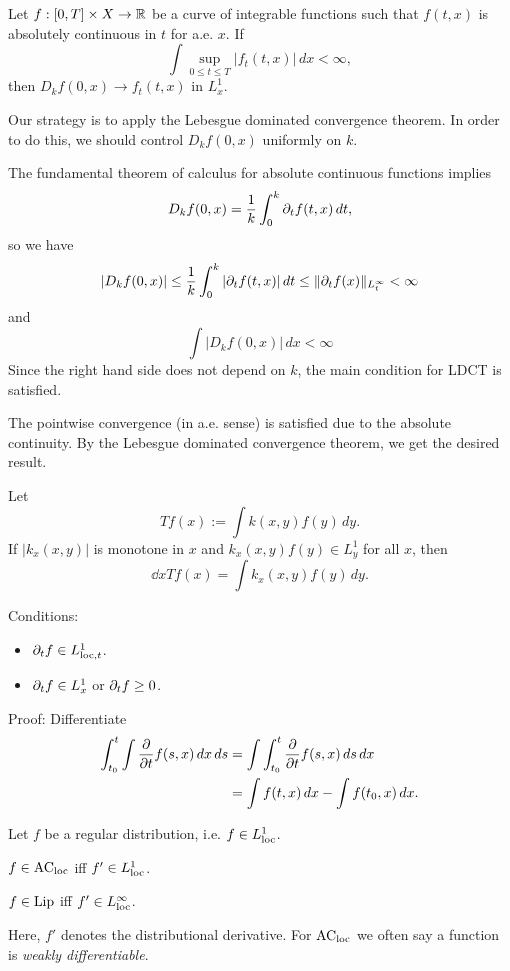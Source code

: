 \documentclass[12pt]{article}
\def\AC{\mathrm{AC}}
\begin{document}
\begin{thm}
Let $f:[0,T]\times X\to\mathbb{R}$ be a curve of integrable functions such that $f(t,x)$ is absolutely continuous in $t$ for a.e. $x$.
If
\[\int\sup_{0\le t\le T}|f_t(t,x)|\,dx<\infty,\]
then $D_kf(0,x)\to f_t(t,x)$ in $L_x^1$.
\end{thm}
\begin{pf}
Our strategy is to apply the Lebesgue dominated convergence theorem.
In order to do this, we should control $D_kf(0,x)$ uniformly on $k$.

The fundamental theorem of calculus for absolute continuous functions implies
\[D_kf(0,x)=\frac1k\int_0^k\pd_tf(t,x)\,dt,\]
so we have
\[|D_kf(0,x)|\le\frac1k\int_0^k|\pd_tf(t,x)|\,dt\le\|\pd_tf(x)\|_{L_t^\infty}<\infty\]
and
\[\int|D_kf(0,x)|\,dx<\infty\]
Since the right hand side does not depend on $k$, the main condition for LDCT is satisfied.

The pointwise convergence (in a.e. sense) is satisfied due to the absolute continuity.
By the Lebesgue dominated convergence theorem, we get the desired result.
\end{pf}
\begin{cor}
Let
\[Tf(x):=\int k(x,y)f(y)\,dy.\]
If $|k_x(x,y)|$ is monotone in $x$ and $k_x(x,y)f(y)\in L_y^1$ for all $x$, then
\[\dd{x}Tf(x)=\int k_x(x,y)f(y)\,dy.\]
\end{cor}


Conditions:
\begin{itemize}
\item $\pd_tf\in L_{\loc,t}^1$.
\item $\pd_tf\in L_x^1$ or $\pd_tf\ge0$.
\end{itemize}
Proof: Differentiate
\begin{align*}
\int^t_{t_0}\int\pd{t}f(s,x)\,dx\,ds
&=\int\int^t_{t_0}\pd{t}f(s,x)\,ds\,dx\\
&=\int f(t,x)\,dx-\int f(t_0,x)\,dx.
\end{align*}

Let $f$ be a regular distribution, i.e. $f\in L_{\mathrm{loc}}^1$.
\begin{parts}
\item $f\in\AC_\loc$ iff $f'\in L_{\mathrm{loc}}^1$.
\item $f\in\operatorname{Lip}$ iff $f'\in L_{\mathrm{loc}}^\infty$.
\end{parts}
Here, $f'$ denotes the distributional derivative.
For $\AC_\loc$ we often say a function is \emph{weakly differentiable}.
\end{document}
